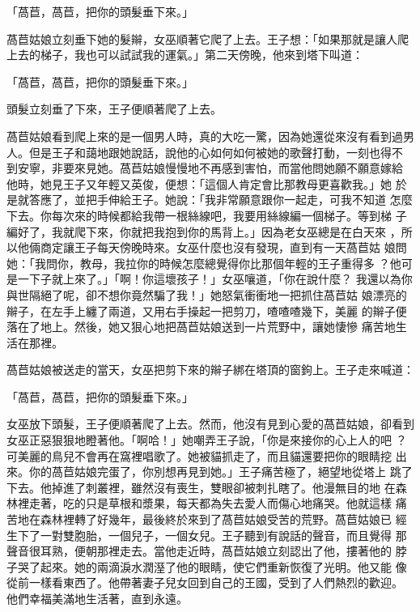 \documentclass[oneside,10pt]{memoir} %
\begin{document}
「萵苣，萵苣，把你的頭髮垂下來。」

萵苣姑娘立刻垂下她的髮辮，女巫順著它爬了上去。王子想：「如果那就是讓人爬
上去的梯子，我也可以試試我的運氣。」第二天傍晚，他來到塔下叫道：

「萵苣，萵苣，把你的頭髮垂下來。」

頭髮立刻垂了下來，王子便順著爬了上去。

萵苣姑娘看到爬上來的是一個男人時，真的大吃一驚，因為她還從來沒有看到過男
人。但是王子和藹地跟她說話，說他的心如何如何被她的歌聲打動，一刻也得不
到安寧，非要來見她。萵苣姑娘慢慢地不再感到害怕，而當他問她願不願意嫁給
他時，她見王子又年輕又英俊，便想：「這個人肯定會比那教母更喜歡我。」她
於是就答應了，並把手伸給王子。她說：「我非常願意跟你一起走，可我不知道
怎麼下去。你每次來的時候都給我帶一根絲線吧，我要用絲線編一個梯子。等到梯
子編好了，我就爬下來，你就把我抱到你的馬背上。」因為老女巫總是在白天來
，所以他倆商定讓王子每天傍晚時來。女巫什麼也沒有發現，直到有一天萵苣姑
娘問她：「我問你，教母，我拉你的時候怎麼總覺得你比那個年輕的王子重得多
？他可是一下子就上來了。」「啊！你這壞孩子！」女巫嚷道，「你在說什麼？
我還以為你與世隔絕了呢，卻不想你竟然騙了我！」她怒氣衝衝地一把抓住萵苣姑
娘漂亮的辮子，在左手上纏了兩道，又用右手操起一把剪刀，喳喳喳幾下，美麗
的辮子便落在了地上。然後，她又狠心地把萵苣姑娘送到一片荒野中，讓她悽慘
痛苦地生活在那裡。

萵苣姑娘被送走的當天，女巫把剪下來的辮子綁在塔頂的窗鉤上。王子走來喊道：

「萵苣，萵苣，把你的頭髮垂下來。」

女巫放下頭髮，王子便順著爬了上去。然而，他沒有見到心愛的萵苣姑娘，卻看到
女巫正惡狠狠地瞪著他。「啊哈！」她嘲弄王子說，「你是來接你的心上人的吧
？可美麗的鳥兒不會再在窩裡唱歌了。她被貓抓走了，而且貓還要把你的眼睛挖
出來。你的萵苣姑娘完蛋了，你別想再見到她。」王子痛苦極了，絕望地從塔上
跳了下去。他掉進了刺叢裡，雖然沒有喪生，雙眼卻被刺扎瞎了。他漫無目的地
在森林裡走著，吃的只是草根和漿果，每天都為失去愛人而傷心地痛哭。他就這樣
痛苦地在森林裡轉了好幾年，最後終於來到了萵苣姑娘受苦的荒野。萵苣姑娘已
經生下了一對雙胞胎，一個兒子，一個女兒。王子聽到有說話的聲音，而且覺得
那聲音很耳熟，便朝那裡走去。當他走近時，萵苣姑娘立刻認出了他，摟著他的
脖子哭了起來。她的兩滴淚水潤溼了他的眼睛，使它們重新恢復了光明。他又能
像從前一樣看東西了。他帶著妻子兒女回到自己的王國，受到了人們熱烈的歡迎。
他們幸福美滿地生活著，直到永遠。

\end{document}
